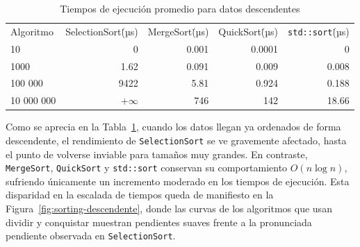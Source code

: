 \begin{table}[ht]
  \centering
  \begin{tabular}{lrrrr}

    Algoritmo  & SelectionSort\.(µs) & MergeSort\.(µs) & QuickSort\.(µs)  & \texttt{std::sort}\.(µs) \\

    10  & 0 & 0.001 & 0.0001 & 0 \\
    1000&1.62&  0.091& 0.009 & 0.008\\
    100 000& 9422& 5.81&0.924&0.188 \\
    10 000 000 & +$\infty$ &  746& 142 &18.66\\

  \end{tabular}
  \caption{Tiempos de ejecución promedio para datos descendentes}
  \label{tab:sorting-results3}
\end{table}

Como se aprecia en la Tabla~\ref{tab:sorting-results3}, cuando los datos llegan ya ordenados de forma descendente, el rendimiento de \texttt{SelectionSort} se ve gravemente afectado, hasta el punto de volverse inviable para tamaños muy grandes. En contraste, \texttt{MergeSort}, \texttt{QuickSort} y \texttt{std::sort} conservan su comportamiento $O(n\log n)$, sufriendo únicamente un incremento moderado en los tiempos de ejecución. Esta disparidad en la escalada de tiempos queda de manifiesto en la Figura~\ref{fig:sorting-descendente}, donde las curvas de los algoritmos que usan dividir y conquistar muestran pendientes suaves frente a la pronunciada pendiente observada en \texttt{SelectionSort}.  

